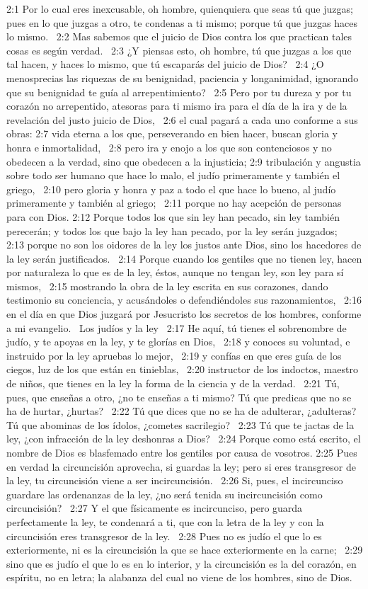 2:1 Por lo cual eres inexcusable, oh hombre, quienquiera que seas tú que juzgas; pues en lo que juzgas a otro, te condenas a ti mismo; porque tú que juzgas haces lo mismo.  
2:2 Mas sabemos que el juicio de Dios contra los que practican tales cosas es según verdad.  
2:3 ¿Y piensas esto, oh hombre, tú que juzgas a los que tal hacen, y haces lo mismo, que tú escaparás del juicio de Dios?  
2:4 ¿O menosprecias las riquezas de su benignidad, paciencia y longanimidad, ignorando que su benignidad te guía al arrepentimiento?  
2:5 Pero por tu dureza y por tu corazón no arrepentido, atesoras para ti mismo ira para el día de la ira y de la revelación del justo juicio de Dios,  
2:6 el cual pagará a cada uno conforme a sus obras: 
2:7 vida eterna a los que, perseverando en bien hacer, buscan gloria y honra e inmortalidad,  
2:8 pero ira y enojo a los que son contenciosos y no obedecen a la verdad, sino que obedecen a la injusticia; 
2:9 tribulación y angustia sobre todo ser humano que hace lo malo, el judío primeramente y también el griego,  
2:10 pero gloria y honra y paz a todo el que hace lo bueno, al judío primeramente y también al griego;  
2:11 porque no hay acepción de personas para con Dios. 
2:12 Porque todos los que sin ley han pecado, sin ley también perecerán; y todos los que bajo la ley han pecado, por la ley serán juzgados;  
2:13 porque no son los oidores de la ley los justos ante Dios, sino los hacedores de la ley serán justificados.  
2:14 Porque cuando los gentiles que no tienen ley, hacen por naturaleza lo que es de la ley, éstos, aunque no tengan ley, son ley para sí mismos,  
2:15 mostrando la obra de la ley escrita en sus corazones, dando testimonio su conciencia, y acusándoles o defendiéndoles sus razonamientos,  
2:16 en el día en que Dios juzgará por Jesucristo los secretos de los hombres, conforme a mi evangelio.  
Los judíos y la ley  
2:17 He aquí, tú tienes el sobrenombre de judío, y te apoyas en la ley, y te glorías en Dios,  
2:18 y conoces su voluntad, e instruido por la ley apruebas lo mejor,  
2:19 y confías en que eres guía de los ciegos, luz de los que están en tinieblas,  
2:20 instructor de los indoctos, maestro de niños, que tienes en la ley la forma de la ciencia y de la verdad.  
2:21 Tú, pues, que enseñas a otro, ¿no te enseñas a ti mismo? Tú que predicas que no se ha de hurtar, ¿hurtas?  
2:22 Tú que dices que no se ha de adulterar, ¿adulteras? Tú que abominas de los ídolos, ¿cometes sacrilegio?  
2:23 Tú que te jactas de la ley, ¿con infracción de la ley deshonras a Dios?  
2:24 Porque como está escrito, el nombre de Dios es blasfemado entre los gentiles por causa de vosotros. 
2:25 Pues en verdad la circuncisión aprovecha, si guardas la ley; pero si eres transgresor de la ley, tu circuncisión viene a ser incircuncisión.  
2:26 Si, pues, el incircunciso guardare las ordenanzas de la ley, ¿no será tenida su incircuncisión como circuncisión?  
2:27 Y el que físicamente es incircunciso, pero guarda perfectamente la ley, te condenará a ti, que con la letra de la ley y con la circuncisión eres transgresor de la ley.  
2:28 Pues no es judío el que lo es exteriormente, ni es la circuncisión la que se hace exteriormente en la carne;  
2:29 sino que es judío el que lo es en lo interior, y la circuncisión es la del corazón, en espíritu, no en letra; la alabanza del cual no viene de los hombres, sino de Dios.  
